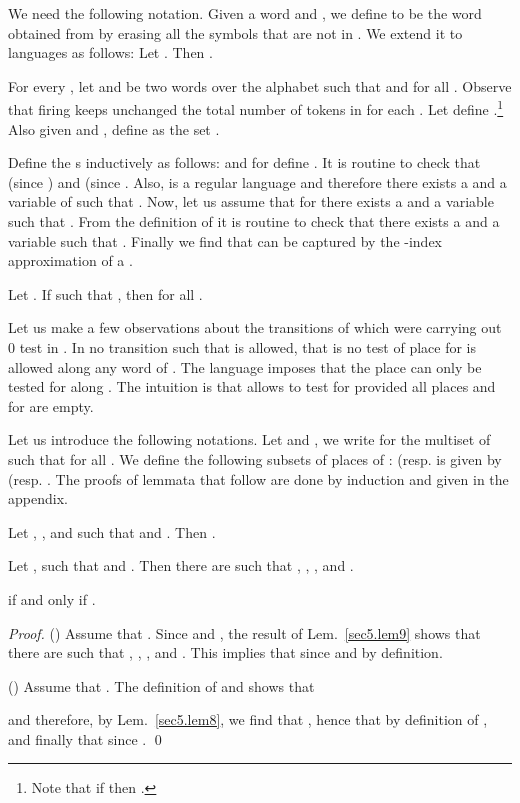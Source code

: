 \documentclass{fsttcs}
\begin{document}
We need the following notation. Given  a word  and , we define  to be the word obtained from  by erasing
all the symbols that are not in . We extend it to languages as follows:
Let . Then .

\smallskip {} For every ,
let  and    be two words over  the alphabet 
such that  and  for all .   Observe that  firing  keeps unchanged the total number of tokens in  for
each . Let
 define .\footnote{Note that if  then
.} Also given  and
, define  as the set .

Define the s  inductively as follows: 
and for  define .  It is routine to check that  (since ) and  (since
. 
{Also,  is a regular
language and therefore there exists a   and a variable 
of  such that .  Now, let us assume that for 
there exists a   and a variable  such that
.  From the definition of  it is routine to
check that there exists a   and a variable  such
that . Finally we find that  can be
captured by the -index approximation of a .
}

\begin{lemma}
\label{sec5.lem7}
Let . If  such
that , then
  for all .
\end{lemma}Let us make a few observations about the transitions of  which were
carrying out 0 test in . In  no transition  such that
 is allowed, that is no test of place  for
 is allowed along any word of . The language 
imposes that the place  can only be tested for  along
. The intuition is that  allows to test
 for  provided all places  and  for 
are empty.

Let us introduce the following notations. Let  and
, we write  for the multiset of 
such that  for all .  We define the following
subsets of places of :  (resp.   is given by
 (resp.  .  The proofs of lemmata that follow
are done by induction and given in the appendix.

\begin{lemma}
\label{sec5.lem8}
Let , , and
 such that \linebreak  and . Then   .
\end{lemma}




\begin{lemma}
\label{sec5.lem9}
Let ,  such that   and  . Then there are  such that , , , and   .
\end{lemma}


\begin{lemma}
\label{sec.th1}
 if and only if .
\end{lemma}
\begin{proof}
({\em }) Assume that . 
Since  and
, the result of Lem.~\ref{sec5.lem9}
shows that there are  such that
, , ,
and . This implies that  since  and
 by definition.

\medskip
\noindent
({\em }) Assume that . 
The definition of  and   shows that

and therefore,  by Lem.~\ref{sec5.lem8}, we find 
that , hence that
 by definition of , and finally that  since .
\qed
\end{proof}
\end{document}
